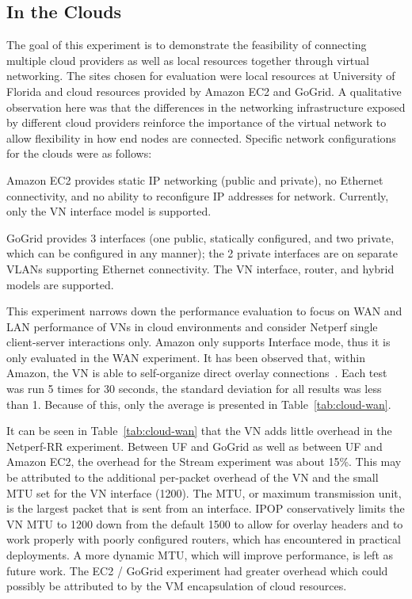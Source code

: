 \subsection{In the Clouds}
The goal of this experiment is to demonstrate the feasibility of connecting
multiple cloud providers as well as local resources together through virtual
networking.  The sites chosen for evaluation were local resources at University
of Florida and cloud resources provided by Amazon EC2 and GoGrid.  A
qualitative observation here was that the differences in the networking
infrastructure exposed by different cloud providers reinforce the importance
of the virtual network to allow flexibility in how end nodes are connected.
Specific network configurations for the clouds were as follows:
\begin{itemize}
\small{
\setlength{\itemsep}{0pt}
\setlength{\parskip}{0pt}
\item Amazon EC2 provides static IP networking (public and private), no
Ethernet connectivity, and no ability to reconfigure IP addresses for
network. Currently, only the VN interface model is supported.
\item GoGrid provides 3 interfaces (one public, statically configured,
and two private, which can be configured in any manner); the 2 private
interfaces are on separate VLANs supporting Ethernet connectivity. The
VN interface, router, and hybrid models are supported.
}
\end{itemize}

This experiment narrows down the performance evaluation to focus on WAN and LAN
performance of VNs in cloud environments and consider Netperf single
client-server interactions only. Amazon only supports Interface mode, thus it
is only evaluated in the WAN experiment. It has been observed that, within
Amazon, the VN is able to self-organize direct overlay connections~\cite{wow}.
Each test was run 5 times for 30 seconds, the standard deviation for all
results was less than 1.  Because of this, only the average is presented in
Table~\ref{tab:cloud-wan}.

It can be seen in Table~\ref{tab:cloud-wan} that the VN adds little
overhead in the Netperf-RR experiment. Between UF and GoGrid as well as between
UF and Amazon EC2, the overhead for the Stream experiment was about 15\%.  This
may be attributed to the additional per-packet overhead of the VN and the small
MTU set for the VN interface (1200).  The MTU, or maximum transmission unit, is
the largest packet that is sent from an interface.  IPOP conservatively limits
the VN MTU to 1200 down from the default 1500 to allow for overlay headers and
to work properly with poorly configured routers, which has encountered in
practical deployments.  A more dynamic MTU, which will improve performance, is
left as future work.  The EC2 / GoGrid experiment had greater overhead
which could possibly be attributed to by the VM encapsulation of cloud
resources.

